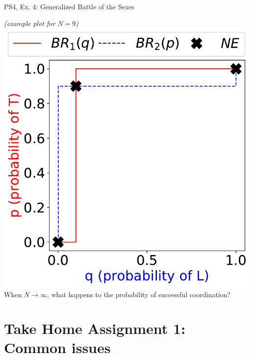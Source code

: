 \begin{frame}{PS4, Ex. 4: Generalized Battle of the Sexes}
\begin{multicols}{2}
    \textit{(example plot for $N=9$)}
    \includegraphics[width=\columnwidth]{figures/4b}
    \vspace{-0pt}
    When $N\rightarrow\infty$, what happens to the probability of successful coordination?
  \vfill\null
  \end{multicols}
\end{frame}


\section{Take Home Assignment 1: Common issues}

